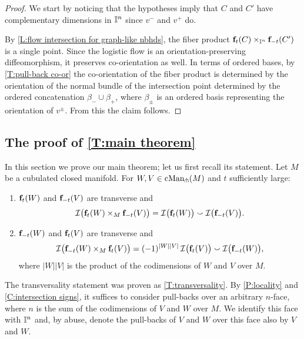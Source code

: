 \begin{proof}
	We start by noticing that the hypotheses imply that $C$ and $C'$ have complementary dimensions in $\mathbb{I}^n$ since $v^-$ and $v^+$ do.

	By \cref{L:flow intersection for graph-like nbhds}, the fiber product $\mathbf{f}_t(C) \times_{\mathbb{I}^n} \mathbf{f}_{-t}(C^\prime)$ is a single point.
	Since the logistic flow is an orientation-preserving diffeomorphism, it preserves co-orientation as well.
	In terms of ordered bases, by \cref{T:pull-back co-or} the co-orientation of the fiber product is determined by the orientation of the normal bundle of the intersection point determined by the ordered concatenation $\beta_- \cup \beta_+$, where $\beta_\pm$ is an ordered basis representing the orientation of $v^\pm$.
	From this the claim follows.
\end{proof}

\subsection{The proof of \cref{T:main theorem}}

In this section we prove our main theorem; let us first recall its statement.
Let $M$ be a cubulated closed manifold.
For $W, V \in \mathrm{cMan}_\pitchfork(M)$ and $t$ sufficiently large:
\begin{enumerate}
	\item $\mathbf{f}_t(W)$ and $\mathbf{f}_{-t}(V)$ are transverse and
	\begin{equation*}
		\mathcal{I} \big( \mathbf{f}_t(W) \times_M \mathbf{f}_{-t}(V) \big) =
		\mathcal{I} \big( \mathbf{f}_t(W) \big) \smallsmile \mathcal{I} \big( \mathbf{f}_{-t}(V) \big).
	\end{equation*}
	\item $\mathbf{f}_{-t}(W)$ and $\mathbf{f}_t(V)$ are transverse and
	\begin{equation*}
		\mathcal{I} \big( \mathbf{f}_{-t}(W) \times_M \mathbf{f}_t(V) \big) =
		(-1)^{|W||V|} \, \mathcal{I} \big( \mathbf{f}_t(V) \big) \smallsmile \mathcal{I} \big( \mathbf{f}_{-t}(W) \big),
	\end{equation*}
	where $|W||V|$ is the product of the codimensions of $W$ and $V$ over $M$.
\end{enumerate}

The transversality statement was proven as \cref{T:transversality}.
By \cref{P:locality} and \cref{C:intersection signs}, it suffices to consider pull-backs over an arbitrary $n$-face, where $n$ is the sum of the codimensions of $V$ and $W$ over $M$.
We identify this face with $\mathbb{I}^n$ and, by abuse, denote the pull-backs of $V$ and $W$ over this face also by $V$ and $W$.

